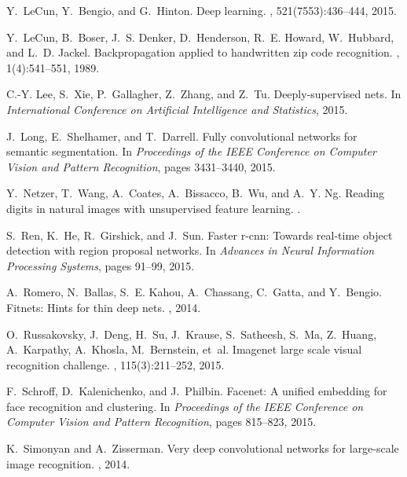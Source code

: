 \documentclass[10pt,onecolumn,letterpaper]{article}
\begin{document}
\begin{thebibliography}{10}
Y.~LeCun, Y.~Bengio, and G.~Hinton.
\newblock Deep learning.
, 521(7553):436--444, 2015.

Y.~LeCun, B.~Boser, J.~S. Denker, D.~Henderson, R.~E. Howard, W.~Hubbard, and
  L.~D. Jackel.
\newblock Backpropagation applied to handwritten zip code recognition.
, 1(4):541--551, 1989.

C.-Y. Lee, S.~Xie, P.~Gallagher, Z.~Zhang, and Z.~Tu.
\newblock Deeply-supervised nets.
\newblock In {\em International Conference on Artificial Intelligence and
  Statistics}, 2015.

J.~Long, E.~Shelhamer, and T.~Darrell.
\newblock Fully convolutional networks for semantic segmentation.
\newblock In {\em Proceedings of the IEEE Conference on Computer Vision and
  Pattern Recognition}, pages 3431--3440, 2015.

Y.~Netzer, T.~Wang, A.~Coates, A.~Bissacco, B.~Wu, and A.~Y. Ng.
\newblock Reading digits in natural images with unsupervised feature learning.
.

S.~Ren, K.~He, R.~Girshick, and J.~Sun.
\newblock Faster r-cnn: Towards real-time object detection with region proposal
  networks.
\newblock In {\em Advances in Neural Information Processing Systems}, pages
  91--99, 2015.

A.~Romero, N.~Ballas, S.~E. Kahou, A.~Chassang, C.~Gatta, and Y.~Bengio.
\newblock Fitnets: Hints for thin deep nets.
, 2014.

O.~Russakovsky, J.~Deng, H.~Su, J.~Krause, S.~Satheesh, S.~Ma, Z.~Huang,
  A.~Karpathy, A.~Khosla, M.~Bernstein, et~al.
\newblock Imagenet large scale visual recognition challenge.
, 115(3):211--252,
  2015.

F.~Schroff, D.~Kalenichenko, and J.~Philbin.
\newblock Facenet: A unified embedding for face recognition and clustering.
\newblock In {\em Proceedings of the IEEE Conference on Computer Vision and
  Pattern Recognition}, pages 815--823, 2015.

K.~Simonyan and A.~Zisserman.
\newblock Very deep convolutional networks for large-scale image recognition.
, 2014.


\end{thebibliography}
\end{document}

